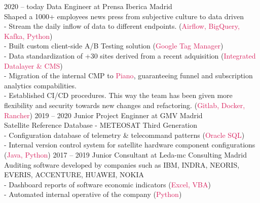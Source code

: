 \documentclass[9pt]{developercv} %
\begin{document}
\begin{entrylist}
	\entry
	{2020 -- today}
	{Data Engineer at Prensa Iberica}
	{Madrid}
	{
	\\{\large Shaped a 1000+ employees news press from subjective culture to data driven}
	\vspace{0.3cm}
	\\- Stream the daily inflow of data to different endpoints. (\textcolor[HTML]{d81e5b}{Airflow, BigQuery, Kafka, Python})
	\\- Built custom client-side A/B Testing solution (\textcolor[HTML]{d81e5b}{Google Tag Manager})
	\\- Data standardization of +30 sites derived from a recent adquisition (\textcolor[HTML]{d81e5b}{Integrated Datalayer \& CMS})
	\\- Migration of the internal CMP to \textcolor[HTML]{d81e5b}{Piano}, guaranteeing funnel and subscription analytics compabilities.
	\\- Established CI/CD procedures. This way the team has been given more flexibility and security towards new changes and refactoring. (\textcolor[HTML]{d81e5b}{Gitlab, Docker, Rancher})
	}
	\entry
	{2019 -- 2020}
	{Junior Project Enginner at GMV}
	{Madrid}
	{
	\\{\large Satellite Reference Database - METEOSAT Third Generation}
	\vspace{0.3cm}
	\\- Configuration database of telemetry \& telecommand patterns (\textcolor[HTML]{d81e5b}{Oracle SQL})
	\\- Internal version control system for satellite hardware component configurations (\textcolor[HTML]{d81e5b}{Java, Python})
	}
	\entry
	{2017 -- 2019}
	{Junior Consultant at Leda-mc Consulting}
	{Madrid}
	{
	\\{\large Auditing software developed by companies such as IBM, INDRA, NEORIS, EVERIS, ACCENTURE, HUAWEI, NOKIA}
	\vspace{0.3cm}
	\\- Dashboard reports of software economic indicators (\textcolor[HTML]{d81e5b}{Excel, VBA})
	\\- Automated internal operative of the company (\textcolor[HTML]{d81e5b}{Python})
	}

\end{entrylist}

\vspace{0.3cm}
\end{document}

